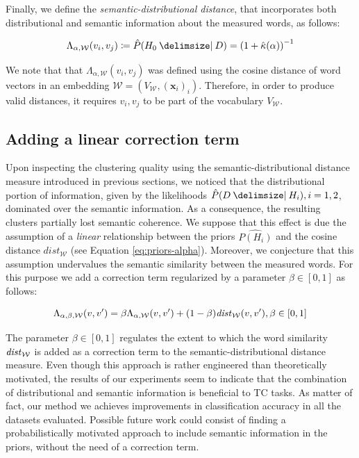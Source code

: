 Finally, we define the \emph{semantic-distributional distance}, that incorporates both distributional and semantic information about 
the measured words, as follows:

\begin{equation}
	\label{eq:dist-v1v2}
	\Lambda_{\alpha, \mathcal{W}}(v_i, v_j) \coloneqq \hat{P}(H_0 \given D)= \left(1 +
	\hat{\kappa}(\alpha) \right)^{-1}
\end{equation}

We note that that $\Lambda_{\alpha, \mathcal{W}}(v_i, v_j)$ was defined using the cosine distance of word vectors in an 
embedding $\mathcal{W}=(V_{\mathcal{W}}, (\mathbf{x}_i)_i)$. Therefore, in order to produce valid distances, 
it requires $v_i, v_j$ to be part of the vocabulary $V_\mathcal{W}$.


\subsection{Adding a linear correction term}
\label{ssec:adding-linear-correction-term}
Upon inspecting the clustering quality using the semantic-distributional distance measure 
introduced in previous sections, we noticed that the distributional portion of information, 
given by the likelihoods $\hat{P}(D\given H_i), i=1,2$, dominated over the semantic information. As a consequence, 
the resulting clusters partially lost semantic coherence. 
We suppose that this effect is due the assumption of a \emph{linear} relationship between the priors $\hat{P(H_i)}$ 
and the cosine distance $dist_\mathcal{W}$ (see Equation \ref{eq:priors-alpha}). Moreover, we  
conjecture that this assumption undervalues the semantic similarity between the measured words. 
 For this purpose we add a correction term regularized by a parameter $\beta \in [0,1]$ as follows:   

\begin{equation*}
	\Lambda_{\alpha,\beta, \mathcal{W}}(v, v') = \beta \Lambda_{\alpha,\mathcal{W}}(v,v')
	+ (1-\beta)\mathit{dist}_\mathcal{W}(v,v'), \beta \in [0,1]
\end{equation*}

The parameter $\beta \in [0,1]$ regulates the extent to which the word similarity $\mathit{dist}_\mathcal{W}$ 
is added as a correction term to the semantic-distributional distance measure. 
Even though this approach is rather engineered than theoretically motivated, the results of our experiments 
seem to indicate that the combination of distributional and semantic information is beneficial to TC tasks.
As matter of fact, our method we achieves improvements in classification accuracy in all the datasets evaluated.
Possible future work could consist of finding a probabilistically motivated approach to include 
semantic information in the priors, without the need of a correction term.   


